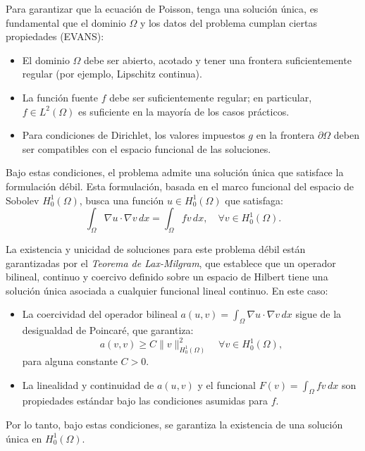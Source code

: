 Para garantizar que la ecuación de Poisson, 
tenga una solución única, es fundamental que el dominio $\Omega$ y los datos del problema cumplan ciertas propiedades (EVANS):

\begin{itemize}
    \item El dominio $\Omega$ debe ser abierto, acotado y tener una frontera suficientemente regular (por ejemplo, Lipschitz continua).
    \item La función fuente $f$ debe ser suficientemente regular; en particular, $f \in L^2(\Omega)$ es suficiente en la mayoría de los casos prácticos.
    \item Para condiciones de Dirichlet, los valores impuestos $g$ en la frontera $\partial \Omega$ deben ser compatibles con el espacio funcional de las soluciones.
\end{itemize}

Bajo estas condiciones, el problema admite una solución única que satisface la formulación débil. Esta formulación, basada en el marco funcional del espacio de Sobolev $H^1_0(\Omega)$, busca una función $u \in H^1_0(\Omega)$ que satisfaga:
\begin{equation}\label{eq:weak_formulation}
    \int_\Omega \nabla u \cdot \nabla v \, dx = \int_\Omega f v \, dx, \quad \forall v \in H^1_0(\Omega).
\end{equation}

La existencia y unicidad de soluciones para este problema débil están garantizadas por el \textit{Teorema de Lax-Milgram}, que establece que un operador bilineal, continuo y coercivo definido sobre un espacio de Hilbert tiene una solución única asociada a cualquier funcional lineal continuo. En este caso:
\begin{itemize}
    \item La coercividad del operador bilineal $a(u, v) = \int_\Omega \nabla u \cdot \nabla v \, dx$ sigue de la desigualdad de Poincaré, que garantiza:
    \begin{equation*}
        a(v, v) \geq C \|v\|^2_{H^1_0(\Omega)} \quad \forall v \in H^1_0(\Omega),
    \end{equation*}
    para alguna constante $C > 0$.
    \item La linealidad y continuidad de $a(u, v)$ y el funcional $F(v) = \int_\Omega f v \, dx$ son propiedades estándar bajo las condiciones asumidas para $f$.
\end{itemize}

Por lo tanto, bajo estas condiciones, se garantiza la existencia de una solución única en $H^1_0(\Omega)$.

